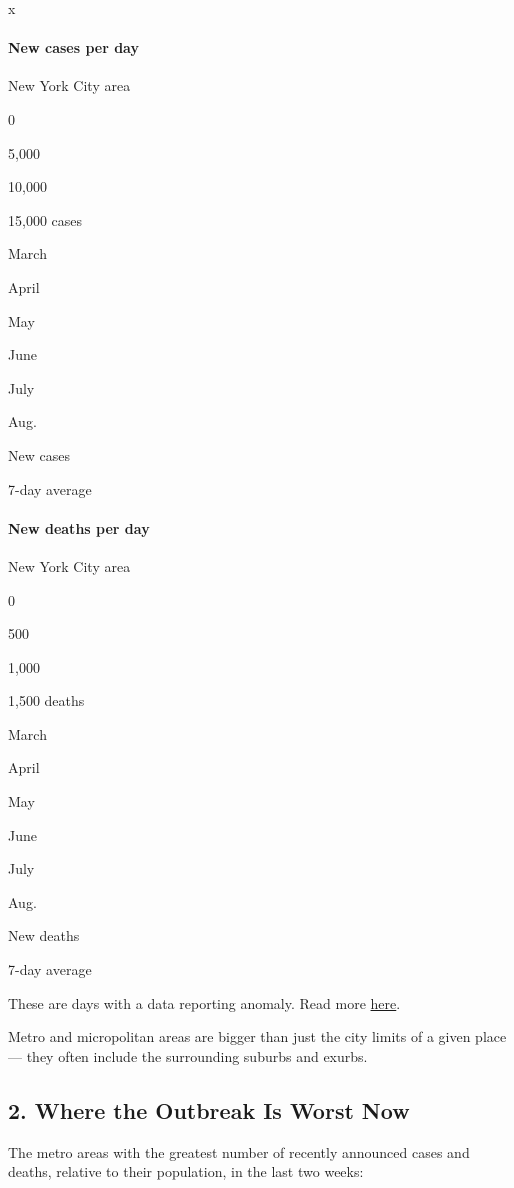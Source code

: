 x

\hypertarget{new-cases-per-day-1}{%
\paragraph{New cases per day}\label{new-cases-per-day-1}}

New York City area

0

5,000

10,000

15,000 cases

March

April

May

June

July

Aug.

New cases

7-day average

\hypertarget{new-deaths-per-day-1}{%
\paragraph{New deaths per day}\label{new-deaths-per-day-1}}

New York City area

0

500

1,000

1,500 deaths

March

April

May

June

July

Aug.

New deaths

7-day average

These are days with a data reporting anomaly. Read more
\protect\hyperlink{anomaly-notes}{here}.

Metro and micropolitan areas are bigger than just the city limits of a
given place --- they often include the surrounding suburbs and exurbs.

\hypertarget{2-where-the-outbreak-is-worst-now}{%
\subsection{2. Where the Outbreak Is Worst
Now}\label{2-where-the-outbreak-is-worst-now}}

The metro areas with the greatest number of recently announced cases and
deaths, relative to their population, in the last two weeks:

